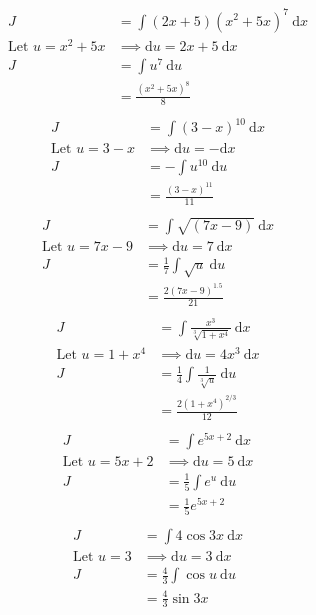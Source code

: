 \documentclass[a4paper,11pt]{article}
\theoremstyle{plain}
\theoremstyle{definition}
\begin{document}
\begin{align*}
	J&=\int (2x+5){(x^2+5x)}^7\ \text{d}x \\
	\text{Let } u = x^2+5x &\implies \text{d}u = 2x+5\ \text{d}x \\
	J&=\int u^7\ \text{d}u \\
	 &=\frac{{\left(x^2+5x\right)}^8}{8} \\
\end{align*}
\begin{align*}
	J&=\int {(3-x)}^{10}\ \text{d}x \\
	\text{Let } u = 3-x &\implies \text{d}u = - \text{d}x \\
	J&=-\int u^{10}\ \text{d}u \\
	 &=\frac{{\left(3-x\right)}^{11}}{11} \\
\end{align*}
\begin{align*}
	J&=\int \sqrt{(7x-9)}\ \text{d}x \\
	\text{Let } u = 7x-9 &\implies \text{d}u = 7\ \text{d}x \\
	J&=\frac{1}{7}\int \sqrt{u}\ \text{d}u \\
	 &=\frac{{2\left(7x-9\right)}^{1.5}}{21} \\
\end{align*}
\begin{align*}
	J&=\int \frac{x^3}{\sqrt[3]{1+x^4}}\ \text{d}x \\
	\text{Let } u = 1+x^4 &\implies \text{d}u = 4x^3\ \text{d}x \\
	J&=\frac{1}{4}\int \frac{1}{\sqrt[3]{u}}\ \text{d}u \\
	 &=\frac{{2\left(1+x^4\right)}^{2/3}}{12} \\
\end{align*}
\begin{align*}
	J&=\int e^{5x+2}\ \text{d}x \\
	\text{Let } u = 5x+2 &\implies \text{d}u = 5\ \text{d}x \\
	J&=\frac{1}{5}\int e^u\ \text{d}u \\
	 &=\frac{1}{5}e^{5x+2} \\
\end{align*}
\begin{align*}
	J&=\int 4\cos 3x\ \text{d}x \\
	\text{Let } u = 3 &\implies \text{d}u = 3\ \text{d}x \\
	J&=\frac{4}{3}\int \cos u\ \text{d}u \\
	 &=\frac{4}{3}\sin 3x \\
\end{align*}
\end{document}
